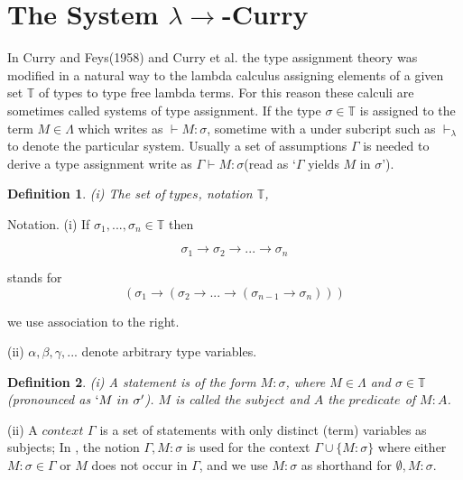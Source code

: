 \documentclass[a4paper,11pt,twoside]{report}
\newtheorem{def1}{\textbf{Definition}}[chapter]
\begin{document}
\section{The System $\lambda \rightarrow $-Curry}

In Curry and Feys(1958) and Curry et al. the type assignment theory was modified in a natural way to the lambda calculus assigning elements of a given set $\mathbb{T}$ of types to type free lambda terms. For this reason these calculi are sometimes called systems of type assignment. If the type $\sigma \in \mathbb{T}$ is assigned to the term $M \in \Lambda$ which writes as $\vdash M : \sigma$, sometime with a under subcript such as $\vdash _\lambda$ to denote the particular system. Usually a set of assumptions $\Gamma$ is needed to derive a type assignment write as $\Gamma \vdash M : \sigma$(read as `$\Gamma$ yields $M$ in $\sigma$').

\begin{def1}
\normalfont (i) The set of $types$, notation $\mathbb{T}$, 
\end{def1} 

Notation. (i) If $\sigma _1,...,\sigma _n \in \mathbb{T}$ then

\begin{equation*}
\sigma _1 \rightarrow \sigma _2 \rightarrow ... \rightarrow \sigma _n
\end{equation*}

\noindent stands for
\begin{equation*}
(\sigma _1 \rightarrow (\sigma _2 \rightarrow ... \rightarrow (\sigma _{n-1} \rightarrow \sigma _n)))
\end{equation*}

\noindent we use association to the right.

     (ii) $\alpha,\beta,\gamma,...$ denote arbitrary type variables.


\begin{def1}
\normalfont (i) A \textit{statement} is of the form $M : \sigma$, where $M\in \Lambda$ and $\sigma \in \mathbb{T}$(pronounced as $`M\ in\ \sigma'$). $M$ is called the $subject$ and $A$ the $predicate$ of $M : A$.  
\end{def1}
(ii) A $context$ $\Gamma$ is a set of statements with only distinct (term) variables as subjects; In \cite{svb2001type}, the notion $\Gamma,M:\sigma$ is used for the context $\Gamma \cup \{M:\sigma\}$ where either $M:\sigma \in \Gamma$ or $M$ does not occur in $\Gamma$, and we use $M:\sigma$ as shorthand for $\emptyset,M:\sigma$.
\end{document}
